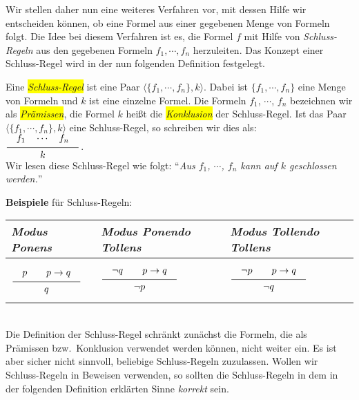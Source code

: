 Wir stellen daher nun eine weiteres Verfahren vor, mit dessen Hilfe wir entscheiden
k\"{o}nnen, ob eine Formel aus einer gegebenen Menge von Formeln folgt.  Die Idee bei diesem Verfahren
ist es, die Formel $f$ mit Hilfe von \emph{Schluss-Regeln} aus den gegebenen Formeln 
$f_1, \cdots, f_n$ herzuleiten.
  Das Konzept einer Schluss-Regel wird in der nun folgenden Definition festgelegt.
\begin{Definition}
    Eine \colorbox{yellow}{\emph{Schluss-Regel}} ist eine Paar  $\langle \{f_1, \cdots, f_n\}, k \rangle$.
    Dabei ist 
    $\{f_1, \cdots, f_n\}$ eine Menge von Formeln und $k$ ist eine einzelne Formel.  
    Die Formeln $f_1$, $\cdots$, $f_n$ bezeichnen wir als
    \colorbox{yellow}{\emph{Pr\"{a}missen}}, die Formel $k$ hei\ss{}t die \colorbox{yellow}{\emph{Konklusion}} der Schluss-Regel.
    Ist das Paar 
    $\langle \{f_1, \cdots, f_n\}, k \rangle$ eine Schluss-Regel, so schreiben wir
    dies als: 
    \\[0.3cm]
    \hspace*{1.3cm}      
    $\schluss{f_1 \quad \cdots \quad f_n}{k}$.
    \\[0.3cm]
    Wir lesen diese Schluss-Regel wie folgt: 
    ``\textsl{Aus $f_1$, $\cdots$, $f_n$ kann auf $k$ geschlossen werden.}''
    \eox
\end{Definition}
\vspace*{0.3cm}

\noindent
\textbf{Beispiele} f\"{u}r Schluss-Regeln: 
\\[0.2cm]
\hspace*{1.3cm}            
\begin{tabular}[t]{|l|l|l|}
\hline
\rule{0pt}{15pt} \emph{Modus Ponens} & \emph{Modus Ponendo Tollens} & \emph{Modus Tollendo Tollens} \\[0.3cm]
\hline
$
\rule[-15pt]{0pt}{40pt}\schluss{p \quad\quad p \rightarrow q}{q}$ &
$\schluss{\neg q \quad\quad p \rightarrow q}{\neg p}$ &
$\schluss{\neg p \quad\quad p \rightarrow q}{\neg q}$ \\[0.3cm]
\hline
\end{tabular}
\\[0.3cm]

\noindent
Die Definition der Schluss-Regel schr\"{a}nkt zun\"{a}chst die Formeln, die als Pr\"{a}missen
bzw.~Konklusion verwendet werden k\"{o}nnen, nicht weiter ein.  Es ist aber sicher nicht
sinnvoll, beliebige Schluss-Regeln zuzulassen.  Wollen wir Schluss-Regeln in Beweisen
verwenden, so sollten die Schluss-Regeln in dem in der folgenden Definition erkl\"{a}rten
Sinne \emph{korrekt} sein.

